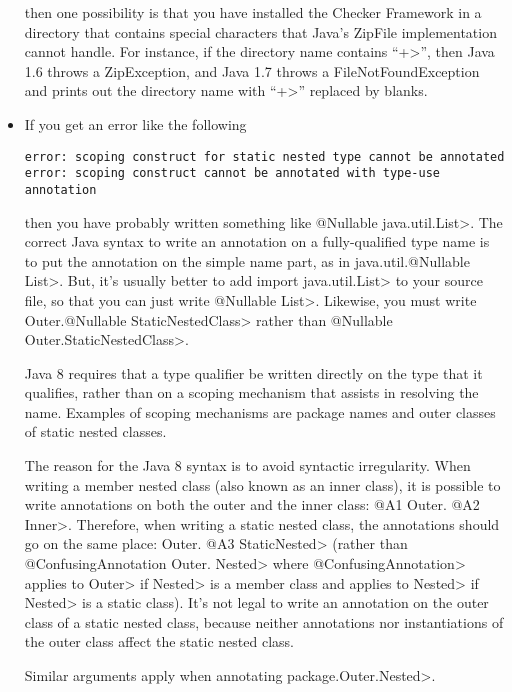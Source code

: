 \begin{itemize}
\noindent
then one possibility is that you have installed the Checker Framework in a
directory that contains special characters that Java's ZipFile
implementation cannot handle.  For instance, if the directory name contains
``\<+>'', then Java 1.6 throws a ZipException, and Java 1.7 throws a
FileNotFoundException and prints out the directory name with ``\<+>''
replaced by blanks.

\item
If you get an error like the following

\begin{Verbatim}
error: scoping construct for static nested type cannot be annotated
error: scoping construct cannot be annotated with type-use annotation
\end{Verbatim}

\noindent
\begin{sloppypar}
then you have probably written something like \<@Nullable java.util.List>.
The correct Java syntax to write an annotation on a fully-qualified type
name is to put the annotation on the simple name part, as in
\<java.util.@Nullable List>.  But, it's usually
better to add \<import java.util.List> to your source file, so that you can
just write \<@Nullable List>.  Likewise, you must write \<Outer.@Nullable
StaticNestedClass> rather than \<@Nullable Outer.StaticNestedClass>.
\end{sloppypar}

Java 8 requires that a type qualifier be written directly on the type that
it qualifies, rather than on a scoping mechanism that assists in resolving
the name.  Examples of scoping mechanisms are package names and outer
classes of static nested classes.

The reason for the Java 8 syntax is to avoid syntactic irregularity.  When
writing a member nested class (also known as an inner class), it is
possible to write annotations on both the outer and the inner class:  \<@A1
Outer. @A2 Inner>.  Therefore, when writing a static nested class, the
annotations should go on the same place:  \<Outer. @A3 StaticNested> (rather
than \<@ConfusingAnnotation Outer. Nested> where
\<@ConfusingAnnotation> applies to \<Outer> if \<Nested> is a member class
and applies to \<Nested> if \<Nested> is a static class).  It's not legal
to write an annotation on the outer class of a static nested class, because
neither annotations nor instantiations of the outer class affect the static
nested class.

Similar arguments apply when annotating \<package.Outer.Nested>.

\end{itemize}


